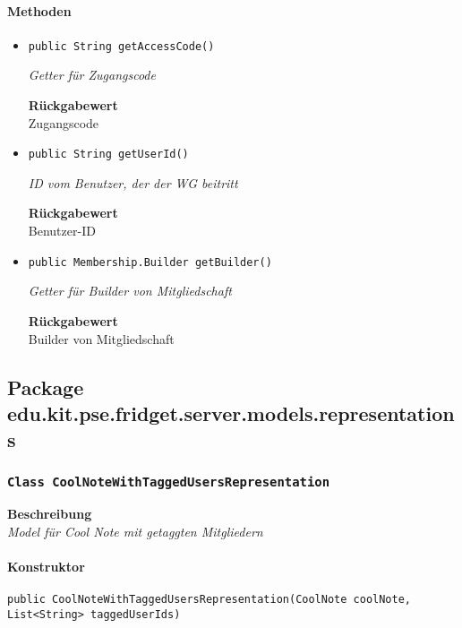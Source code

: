     \paragraph*{Methoden}
    \begin{itemize}
    	\item{\texttt{public String getAccessCode()}}
    	
    	\textit{Getter für Zugangscode}
    	
    	
    	
    	\textbf{Rückgabewert} \\
    	Zugangscode        \item{\texttt{public String getUserId()}}
    	
    	\textit{ID vom Benutzer, der der WG beitritt}
    	
    	
    	
    	\textbf{Rückgabewert} \\
    	Benutzer-ID        \item{\texttt{public Membership.Builder getBuilder()}}
    	
    	\textit{Getter für Builder von Mitgliedschaft}
    	
    	
    	
    	\textbf{Rückgabewert} \\
    	Builder von Mitgliedschaft
    \end{itemize}
    \subsection{Package edu.kit.pse.fridget.server.models.representations}
    \subsubsection{\texttt{Class CoolNoteWithTaggedUsersRepresentation}}
    \textbf{Beschreibung} \\
    \textit{Model für Cool Note mit getaggten Mitgliedern}
    \paragraph*{Konstruktor}
    \texttt{public CoolNoteWithTaggedUsersRepresentation(CoolNote coolNote, List<String> taggedUserIds)}
